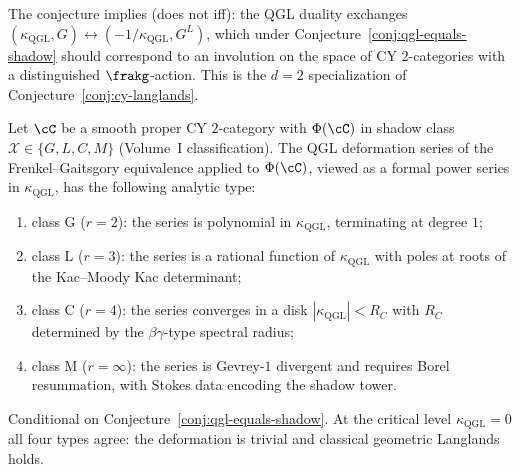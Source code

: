 The conjecture implies (does not iff): the QGL duality exchanges $(\kappa_{\mathrm{QGL}}, G) \leftrightarrow (-1/\kappa_{\mathrm{QGL}}, G^L)$, which under Conjecture~\ref{conj:qgl-equals-shadow} should correspond to an involution on the space of CY $2$-categories with a distinguished $\frakg$-action. This is the $d = 2$ specialization of Conjecture~\ref{conj:cy-langlands}.

\begin{conjecture}
\label{conj:shadow-convergence-qgl}
\ClaimStatusConjectured
Let $\cC$ be a smooth proper CY $2$-category with $\Phi(\cC)$ in shadow class $\mathcal{X} \in \{G, L, C, M\}$ (Volume~I classification). The QGL deformation series of the Frenkel--Gaitsgory equivalence applied to $\Phi(\cC)$, viewed as a formal power series in $\kappa_{\mathrm{QGL}}$, has the following analytic type:
\begin{enumerate}[label=(\alph*)]
 \item class G ($r = 2$): the series is polynomial in $\kappa_{\mathrm{QGL}}$, terminating at degree $1$;
 \item class L ($r = 3$): the series is a rational function of $\kappa_{\mathrm{QGL}}$ with poles at roots of the Kac--Moody Kac determinant;
 \item class C ($r = 4$): the series converges in a disk $|\kappa_{\mathrm{QGL}}| < R_C$ with $R_C$ determined by the $\beta\gamma$-type spectral radius;
 \item class M ($r = \infty$): the series is Gevrey-$1$ divergent and requires Borel resummation, with Stokes data encoding the shadow tower.
\end{enumerate}
Conditional on Conjecture~\ref{conj:qgl-equals-shadow}. At the critical level $\kappa_{\mathrm{QGL}} = 0$ all four types agree: the deformation is trivial and classical geometric Langlands holds.
\end{conjecture}

